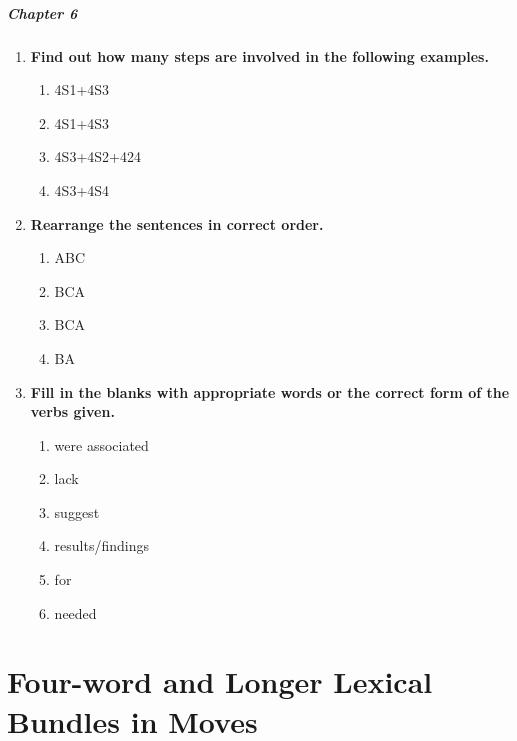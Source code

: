 \documentclass[a4paper]{ctexbook}
\begin{document}
\paragraph*{Chapter 6}\par
\begin{enumerate}
  \item \textbf{Find out how many steps are involved in the following examples.}
  \begin{enumerate}
    \item 4S1+4S3
    \item 4S1+4S3
    \item 4S3+4S2+424
    \item 4S3+4S4
  \end{enumerate}

  \item \textbf{Rearrange the sentences in correct order.}
  \begin{enumerate}
    \item ABC
    \item BCA
    \item BCA
    \item BA
  \end{enumerate}

  \item \textbf{Fill in the blanks with appropriate words or the correct form of the verbs given.}
  \begin{enumerate}
    \item were associated
    \item lack
    \item suggest
    \item results/findings
    \item for
    \item needed
  \end{enumerate}
\end{enumerate}


\appendix

\chapter{Four-word and Longer Lexical Bundles in Moves}
\end{document}

